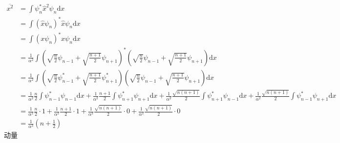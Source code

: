 \begin{equation}
    \begin{aligned}
        \overline{x^2}&=\int{\psi _{n}^{*}\hat{x}^2\psi _n\mathrm{d}x}
\\
&=\int{\left( \hat{x}\psi _n \right) ^*\hat{x}\psi _n\mathrm{d}x}
\\
&=\int{\left( x\psi _n \right) ^*x\psi _n\mathrm{d}x}
\\
&=\frac{1}{\alpha ^2}\int{\left( \sqrt{\frac{n}{2}}\psi _{n-1}+\sqrt{\frac{n+1}{2}}\psi _{n+1} \right) ^*\left( \sqrt{\frac{n}{2}}\psi _{n-1}+\sqrt{\frac{n+1}{2}}\psi _{n+1} \right) \mathrm{d}x}
\\
&=\frac{1}{\alpha ^2}\int{\left( \sqrt{\frac{n}{2}}\psi _{n-1}^{*}+\sqrt{\frac{n+1}{2}}\psi _{n+1}^{*} \right) \left( \sqrt{\frac{n}{2}}\psi _{n-1}+\sqrt{\frac{n+1}{2}}\psi _{n+1} \right) \mathrm{d}x}
\\
&=\frac{1}{\alpha ^2}\frac{n}{2}\int{\psi _{n-1}^{*}\psi _{n-1}\mathrm{d}x}+\frac{1}{\alpha ^2}\frac{n+1}{2}\int{\psi _{n+1}^{*}\psi _{n+1}\mathrm{d}x}+\frac{1}{\alpha ^2}\frac{\sqrt{n\left( n+1 \right)}}{2}\int{\psi _{n+1}^{*}\psi _{n-1}\mathrm{d}x}+\frac{1}{\alpha ^2}\frac{\sqrt{n\left( n+1 \right)}}{2}\int{\psi _{n-1}^{*}\psi _{n+1}\mathrm{d}x}
\\
&=\frac{1}{\alpha ^2}\frac{n}{2}\cdot 1+\frac{1}{\alpha ^2}\frac{n+1}{2}\cdot 1+\frac{1}{\alpha ^2}\frac{\sqrt{n\left( n+1 \right)}}{2}\cdot 0+\frac{1}{\alpha ^2}\frac{\sqrt{n\left( n+1 \right)}}{2}\cdot 0
\\
&=\frac{1}{\alpha ^2}\left( n+\frac{1}{2} \right) 
    \end{aligned}
\end{equation}
动量
